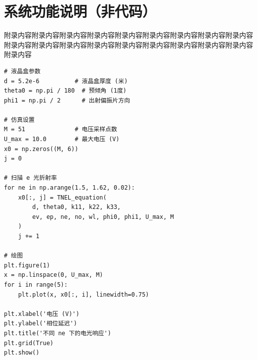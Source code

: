 \ifShowBibliography
{}

\fi

\ifShowAppendix
{}
\appendix

\section{系统功能说明（非代码）}
附录内容附录内容附录内容附录内容附录内容附录内容附录内容附录内容附录内容附录内容附录内容附录内容附录内容附录内容附录内容附录内容附录内容附录内容附录内容

\begin{lstlisting}[style=pythonstyle]
# 液晶盒参数
d = 5.2e-6          # 液晶盒厚度 (米)
theta0 = np.pi / 180  # 预倾角 (1度)
phi1 = np.pi / 2      # 出射偏振片方向

# 仿真设置
M = 51              # 电压采样点数
U_max = 10.0        # 最大电压 (V)
x0 = np.zeros((M, 6))
j = 0

# 扫描 e 光折射率
for ne in np.arange(1.5, 1.62, 0.02):
    x0[:, j] = TNEL_equation(
        d, theta0, k11, k22, k33,
        ev, ep, ne, no, wl, phi0, phi1, U_max, M
    )
    j += 1

# 绘图
plt.figure(1)
x = np.linspace(0, U_max, M)
for i in range(5):
    plt.plot(x, x0[:, i], linewidth=0.75)

plt.xlabel('电压 (V)')
plt.ylabel('相位延迟')
plt.title('不同 ne 下的电光响应')
plt.grid(True)
plt.show()
\end{lstlisting}
\fi